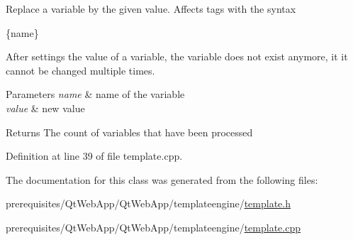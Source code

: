 Replace a variable by the given value. Affects tags with the syntax


\begin{DoxyItemize}
\item \{name\}
\end{DoxyItemize}

After settings the value of a variable, the variable does not exist anymore, it it cannot be changed multiple times. 
\begin{DoxyParams}{Parameters}
{\em name} & name of the variable \\
\hline
{\em value} & new value \\
\hline
\end{DoxyParams}
\begin{DoxyReturn}{Returns}
The count of variables that have been processed 
\end{DoxyReturn}


Definition at line 39 of file template.\+cpp.



The documentation for this class was generated from the following files\+:\begin{DoxyCompactItemize}
\item 
prerequisites/\+Qt\+Web\+App/\+Qt\+Web\+App/templateengine/\mbox{\hyperlink{template_8h}{template.\+h}}\item 
prerequisites/\+Qt\+Web\+App/\+Qt\+Web\+App/templateengine/\mbox{\hyperlink{template_8cpp}{template.\+cpp}}\end{DoxyCompactItemize}
